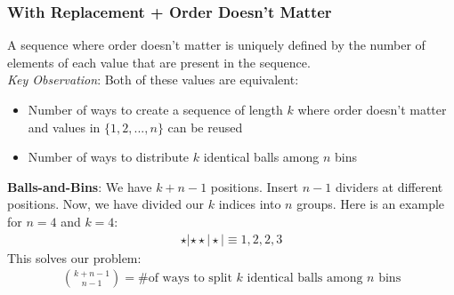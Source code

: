\documentclass{beamer}
\begin{document}
\begin{frame}
    \frametitle{With Replacement + Order Doesn't Matter}
    A sequence where order doesn't matter is uniquely defined by the number of elements of each value that are present in the sequence.\\
    {\it Key Observation}: Both of these values are equivalent:
    \begin{itemize}
        \item Number of ways to create a sequence of length $k$ where order doesn't matter and values in $\{1,2,...,n\}$ can be reused
        \item Number of ways to distribute $k$ identical balls among $n$ bins
    \end{itemize}
    {\bf Balls-and-Bins}: We have $k+n-1$ positions. Insert $n-1$ dividers at different positions. Now, we have divided our $k$ indices into $n$ groups. Here is an example for $n=4$ and $k=4$:
    \begin{gather*}
        \star|\star\star|\star|\equiv 1,2,2,3
    \end{gather*}
    This solves our problem:
    \begin{gather*}
        \boxed{\binom{k+n-1}{n-1}}=\text{\# of ways to split $k$ identical balls among $n$ bins}
    \end{gather*}
\end{frame}
\end{document}
